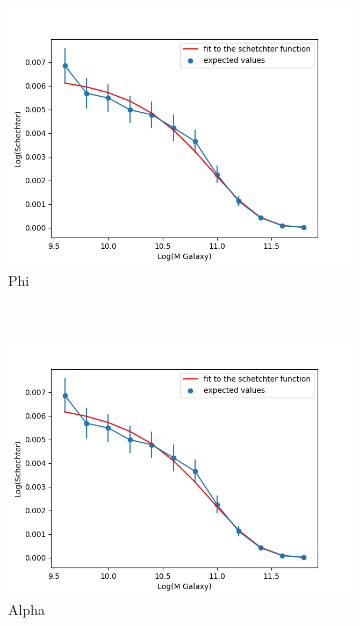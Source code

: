 \documentclass[12pt]{article}
\begin{document}
\begin{figure}
    \centering
    \begin{subfigure}[b]{0.4\textwidth}
        \includegraphics[width=\textwidth]{HW2_schecterfit_phi.png}
        \caption{Phi}
        \label{fig:phi}
    \end{subfigure}
    ~ 
    \begin{subfigure}[b]{0.4\textwidth}
        \includegraphics[width=\textwidth]{HW2_schecterfit_alpha.png}
        \caption{Alpha}
        \label{fig:alpha}
    \end{subfigure}
    ~
    \begin{subfigure}[b]{0.4\textwidth}

\end{subfigure}
\end{figure}
\end{document}
